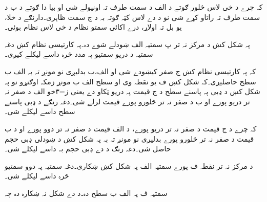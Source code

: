    کہ چرے د خی لاس څلور ګوتے د الف د سمت طرف تہ اونیولے شی او بیا دا ګوتے د ب د سمت طرف تہ راتاو کړے شی نو د دے لاس کټہ ګوتہ بہ د ج سمت ظاہری۔دارنګے د خلا، یو بل تہ اولاړ، درے اکائی سمتو نظام د خی لاس نظام بوئی۔

پہ شکل کښ د مرکز نہ تر پ سمتیہ الف ښودلے شوے دہ۔پہ کارتیسی نظام کښ دغہ سمتیہ د دریو سمتیو  پہ مدد څرہ داسے لیکلے کیږی۔

کہ پہ کارتیسی نظام کښ ج صفر کیښودے شی او الف،ب بدلیږی نو مونږ تہ بہ الف ب سطح حاصلیږی۔کہ شکل کښ ف یو نقطہ وی او سطح الف ب مونږ زمکہ اوګنړو نو پہ شکل کښ د ډبی پہ پاسنے سطح د ج قیمت  پہ دریو ټکاو دے یعنی ز=۳خو الف د صفر نہ تر دریو پورے او ب د صفر نہ تر څلورو پورے قیمت لرلے شی۔دغہ رنګے د ډبی پاسنے سطح داسے لیکلے شی۔

کہ چرے د ج قیمت د صفر نہ تر دریو پورے، د الف قیمت د صفر نہ تر دوو پورے او د ب قیمت د صفر نہ تر څلورو پورے بدلیږی نو مونږ تہ بہ پہ شکل کښ د ښودلی ډبی حجم حاصل شی۔دغہ رنګ د دے ډبی حجم بہ  داسے لیکلے شی۔   

 د مرکز نہ  تر نقطہ ف پورے سمتیہ الف پہ شکل کښ ښکاری۔دغہ سمتیہ پہ دوو سمتیو څرہ داسے لیکلے شی۔

 سمتیہ ف پہ الف ب سطح دہ۔د دے شکل نہ ښکارہ دہ چہ





  
